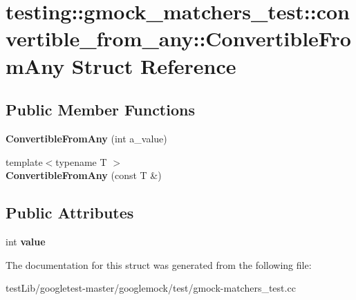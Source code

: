 \hypertarget{structtesting_1_1gmock__matchers__test_1_1convertible__from__any_1_1ConvertibleFromAny}{}\section{testing\+:\+:gmock\+\_\+matchers\+\_\+test\+:\+:convertible\+\_\+from\+\_\+any\+:\+:Convertible\+From\+Any Struct Reference}
\label{structtesting_1_1gmock__matchers__test_1_1convertible__from__any_1_1ConvertibleFromAny}
\subsection*{Public Member Functions}
\begin{DoxyCompactItemize}
\item 
\mbox{\label{structtesting_1_1gmock__matchers__test_1_1convertible__from__any_1_1ConvertibleFromAny_a5bee1e70fa860c1219928f82006e2b2b}} 
{\bfseries Convertible\+From\+Any} (int a\+\_\+value)
\item 
\mbox{\label{structtesting_1_1gmock__matchers__test_1_1convertible__from__any_1_1ConvertibleFromAny_a1192b2a272c6ce8e6fc75a9448417a4f}} 
{\footnotesize template$<$typename T $>$ }\\{\bfseries Convertible\+From\+Any} (const T \&)
\end{DoxyCompactItemize}
\subsection*{Public Attributes}
\begin{DoxyCompactItemize}
\item 
\mbox{\label{structtesting_1_1gmock__matchers__test_1_1convertible__from__any_1_1ConvertibleFromAny_a4fdd0c9f00eced05d2af01b3cf28889f}} 
int {\bfseries value}
\end{DoxyCompactItemize}


The documentation for this struct was generated from the following file\+:\begin{DoxyCompactItemize}
\item 
test\+Lib/googletest-\/master/googlemock/test/gmock-\/matchers\+\_\+test.\+cc\end{DoxyCompactItemize}

